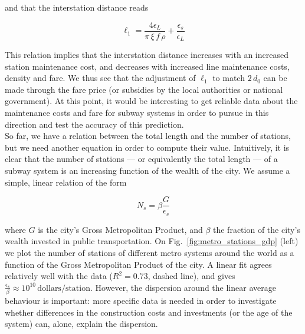 and that the interstation distance reads

\begin{equation}
    \ell_1 = \frac{4 \epsilon_L}{\pi\,\xi\,f\,\rho} + \frac{\epsilon_s}{\epsilon_L}
\end{equation}

This relation implies that the interstation distance increases with an increased
station maintenance cost, and decreases with increased line maintenance costs,
density and fare. We thus see that the adjustment of $\ell_1$ to match $2\,d_0$
can be made through the fare price (or subsidies by the local authorities or
national government). At this point, it would be interesting to get reliable
data about the maintenance costs and fare for subway systems in order to pursue
in this direction and test the accuracy of this prediction.\\

So far, we have a relation between the total length and the number of stations,
but we need another equation in order to compute their value. Intuitively, it is
clear that the number of stations --- or equivalently the total length --- of a
subway system is an increasing function of the wealth of the city. We assume a
simple, linear relation of the form

\begin{equation}
    N_s = \beta \frac{G}{\epsilon_s}
\end{equation}

where $G$ is the city's Gross Metropolitan Product, and $\beta$ the fraction of
the city's wealth invested in public transportation. On
Fig.~\ref{fig:metro_stations_gdp} (left) we plot the number of stations of
different metro systems around the world as a function of the Gross Metropolitan
Product of the city. A linear fit agrees relatively well with the data
($R^2=0.73$, dashed line), and gives $\frac{\epsilon_s}{\beta} \approx
10^{10}\,\text{dollars/station}$. However, the dispersion around the linear
average behaviour is important: more specific data is needed in order to
investigate whether differences in the construction costs and investments (or
the age of the system) can, alone, explain the dispersion.

